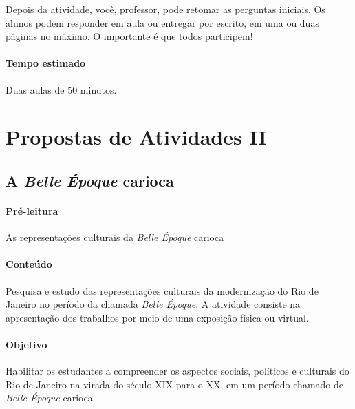 \documentclass[12pt]{extarticle}
\begin{document}
Depois da atividade, você, professor, pode retomar as perguntas
iniciais. Os alunos podem responder em aula ou entregar por escrito, em
uma ou duas páginas no máximo. O importante é que todos participem!

\paragraph{Tempo estimado} Duas aulas de 50 minutos.



\section{Propostas de Atividades II}

\subsection{A \emph{Belle Époque} carioca}

\paragraph{Pré-leitura} As representações culturais da \emph{Belle Époque} carioca



\paragraph{Conteúdo} Pesquisa e estudo das representações culturais da
modernização do Rio de Janeiro no período da chamada \emph{Belle
Époque}. A atividade consiste na apresentação dos trabalhos por meio de
uma exposição física ou virtual.

\paragraph{Objetivo} Habilitar os estudantes a compreender os aspectos
sociais, políticos e culturais do Rio de Janeiro na virada do século XIX
para o XX, em um período chamado de \emph{Belle Époque} carioca.


\end{document}

